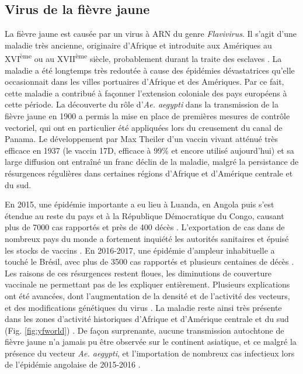 \subsection{Virus de la fièvre jaune}

La fièvre jaune est causée par un virus à ARN du genre {\em Flavivirus}.
Il s'agit d'une maladie très ancienne, originaire d'Afrique et introduite aux Amériques au XVI\textsuperscript{ème} ou au XVII\textsuperscript{ème} siècle, probablement durant la traite des esclaves \cite{bryant2007out}.
La maladie a été longtemps très redoutée à cause des épidémies dévastatrices qu'elle occasionnait dans les villes portuaires d'Afrique et des Amériques.
Par ce fait, cette maladie a contribué à façonner l'extension coloniale des pays européens à cette période.
La découverte du rôle d'{\em Ae. aegypti} dans la transmission de la fièvre jaune en 1900 a permis la mise en place de premières mesures de contrôle vectoriel, qui ont en particulier été appliquées lors du creusement du canal de Panama.
Le développement par Max Theiler d'un vaccin vivant atténué très efficace en 1937 (le vaccin 17D, efficace à 99\% et encore utilisé aujourd'hui) et sa large diffusion ont entraîné un franc déclin de la maladie, malgré la persistance de résurgences régulières dans certaines régions d'Afrique et d'Amérique centrale et du sud. 

En 2015, une épidémie importante a eu lieu à Luanda, en Angola puis s'est étendue au reste du pays et à la République Démocratique du Congo, causant plus de 7000 cas rapportés et près de 400 décès \cite{kraemer2017spread}. 
L'exportation de cas dans de nombreux pays du monde a fortement inquiété les autorités sanitaires et épuisé les stocks de vaccins \cite{barrett2016yellow}.
En 2016-2017, une épidémie d'ampleur inhabituelle a touché le Brésil, avec plus de 3500 cas rapportés et plusieurs centaines de décès \cite{moreira2018evidence}.
Les raisons de ces résurgences restent floues, les diminutions de couverture vaccinale ne permettant pas de les expliquer entièrement.
Plusieurs explications ont été avancées, dont l'augmentation de la densité et de l'activité des vecteurs, et des modifications génétiques du virus \cite{monath2015yellow}.
La maladie reste ainsi très présente dans les zones d'activité historiques d'Afrique et d'Amérique centrale et du sud (Fig. \ref{fig:yfworld}) \cite{shearer2018existing}.
De façon surprenante, aucune transmission autochtone de fièvre jaune n'a jamais pu être observée sur le continent asiatique, et ce malgré la présence du vecteur {\em Ae. aegypti}, et l'importation de nombreux cas infectieux lors de l'épidémie angolaise de 2015-2016 \cite{chen2016yellow}.

